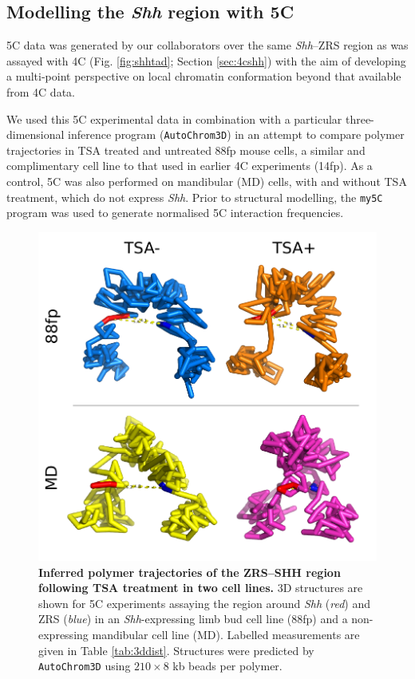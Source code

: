 \documentclass[a4paper,11pt,oneside]{book}
\begin{document}
\subsection{Modelling the \emph{Shh} region with 5C}\label{sec:shh5c}

5C data was generated by our collaborators over the same \emph{Shh}--ZRS region as was assayed with 4C (Fig. \ref{fig:shhtad}; Section \ref{sec:4cshh}) with the aim of developing a multi-point perspective on local chromatin conformation beyond that available from 4C data.

We used this 5C experimental data in combination with a particular three-dimensional inference program  (\texttt{AutoChrom3D}\cite{Peng2013}) in an attempt to compare polymer trajectories in TSA treated and untreated 88fp mouse cells, a similar and complimentary cell line to that used in earlier 4C experiments (14fp). As a control, 5C was also performed on mandibular (MD) cells, with and without TSA treatment, which do not express \emph{Shh}. Prior to structural modelling, the \texttt{my5C} program was used to generate normalised 5C interaction frequencies.\cite{Lajoie2009a}

\begin{figure}
\begin{center} 
\includegraphics[width=5.45in]{figs/5c3d.pdf}
\captionsetup{width=\textwidth} 
\caption[ Inferred polymer trajectories of the ZRS--SHH region following TSA treatment in two cell lines. ]{ {\bf Inferred polymer trajectories of the ZRS--SHH region following TSA treatment in two cell lines. }
3D structures are shown for 5C experiments assaying the region around \emph{Shh} (\emph{red}) and ZRS (\emph{blue}) in an \emph{Shh}-expressing limb bud cell line (88fp) and a non-expressing mandibular cell line (MD). Labelled measurements are given in Table \ref{tab:3ddist}. Structures were predicted by \texttt{AutoChrom3D}\cite{Peng2013} using $210 \times 8$ kb beads per polymer.
}\label{fig:5c3d}
\end{center} 
\end{figure} 
\end{document}
